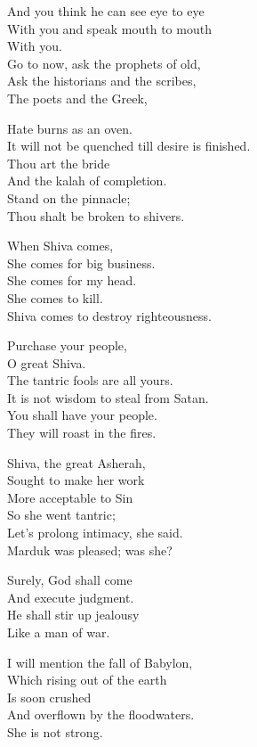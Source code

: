 \documentclass[
]{book}
\begin{document}
And you think he can see eye to eye\\
With you and speak mouth to mouth\\
With you.\\
Go to now, ask the prophets of old,\\
Ask the historians and the scribes,\\
The poets and the Greek,

Hate burns as an oven.\\
It will not be quenched till desire is finished.\\
Thou art the bride\\
And the kalah of completion.\\
Stand on the pinnacle;\\
Thou shalt be broken to shivers.

When Shiva comes,\\
She comes for big business.\\
She comes for my head.\\
She comes to kill.\\
Shiva comes to destroy righteousness.

Purchase your people,\\
O great Shiva.\\
The tantric fools are all yours.\\
It is not wisdom to steal from Satan.\\
You shall have your people.\\
They will roast in the fires.

Shiva, the great Asherah,\\
Sought to make her work\\
More acceptable to Sin\\
So she went tantric;\\
Let's prolong intimacy, she said.\\
Marduk was pleased; was she?

Surely, God shall come\\
And execute judgment.\\
He shall stir up jealousy\\
Like a man of war.

I will mention the fall of Babylon,\\
Which rising out of the earth\\
Is soon crushed\\
And overflown by the floodwaters.\\
She is not strong.
\end{document}
